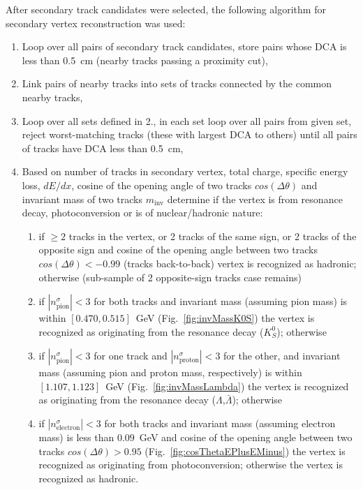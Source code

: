 After secondary track candidates were selected, the following algorithm for secondary vertex reconstruction was used:%
\vspace{-6pt}\begin{enumerate}
    \item Loop over all pairs of secondary track candidates, store pairs whose DCA is less than 0.5~cm (nearby tracks passing a proximity cut),\vspace{-6pt}
    \item Link pairs of nearby tracks into sets of tracks connected by the common nearby tracks,\vspace{-6pt}
    \item Loop over all sets defined in 2., in each set loop over all pairs from given set, reject worst-matching tracks (these with largest DCA to others) until all pairs of tracks have DCA less than 0.5~cm,\vspace{-6pt}
    \item Based on number of tracks in secondary vertex, total charge, specific energy loss, $dE/dx$, cosine of the opening angle of two tracks $cos(\Delta\theta)$ and invariant mass of two tracks $m_{\text{inv}}$ determine if the vertex is from resonance decay, photoconversion or is of nuclear/hadronic nature:\\[-16pt]
    \begin{enumerate}
    \item if $\geq2$ tracks in the vertex, or 2 tracks of the same sign, or 2 tracks of the opposite sign and cosine of the opening angle between two tracks $cos(\Delta\theta)<-0.99$ (tracks back-to-back) vertex is recognized as hadronic; otherwise (sub-sample of 2 opposite-sign tracks case remains)\\[-15pt]
    \item if $|n^{\sigma}_{\text{pion}}|<3$ for both tracks and invariant mass (assuming pion mass) is within $[0.470,0.515]$~GeV (Fig.~\ref{fig:invMassK0S}) the vertex is recognized as originating from the resonance decay ($K^{0}_{S}$); otherwise\\[-15pt]
    \item if $|n^{\sigma}_{\text{pion}}|<3$ for one track and $|n^{\sigma}_{\text{proton}}|<3$ for the other, and invariant mass (assuming pion and proton mass, respectively) is within $[1.107,1.123]$~GeV (Fig.~\ref{fig:invMassLambda}) the vertex is recognized as originating from the resonance decay ($\Lambda$,$\bar{\Lambda}$); otherwise\\[-15pt]
    \item if $|n^{\sigma}_{\text{electron}}|<3$ for both tracks and invariant mass (assuming electron mass) is less than $0.09$~GeV and cosine of the opening angle between two tracks $cos(\Delta\theta)>0.95$ (Fig.~\ref{fig:cosThetaEPlusEMinus}) the vertex is recognized as originating from photoconversion; otherwise the vertex is recognized as hadronic.
    \end{enumerate}%
\end{enumerate}%
